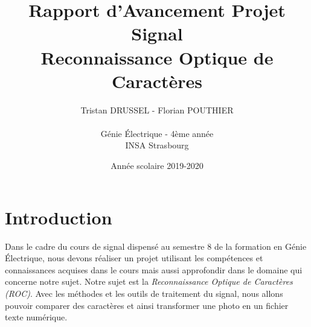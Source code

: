 \documentclass[a4paper,12pt,titlepage]{report}
\title{Rapport d'Avancement Projet Signal\\Reconnaissance Optique de Caractères}
\author{Tristan DRUSSEL - Florian POUTHIER \\ \\ Génie Électrique - 4ème année\\ INSA Strasbourg}
\date{Année scolaire 2019-2020}
\begin{document}
	\begin{titlepage}
		\maketitle
	\end{titlepage}
	\tableofcontents
	\newpage
	\section*{Introduction}
		Dans le cadre du cours de signal dispensé au semestre 8 de la formation en Génie Électrique, nous devons réaliser un projet utilisant les compétences et connaissances acquises dans le cours mais aussi approfondir dans le domaine qui concerne notre sujet.
		Notre sujet est la \textit{Reconnaissance Optique de Caractères (ROC)}. Avec les méthodes et les outils de traitement du signal, nous allons pouvoir comparer des caractères et ainsi transformer une photo en un fichier texte numérique.
\end{document}
